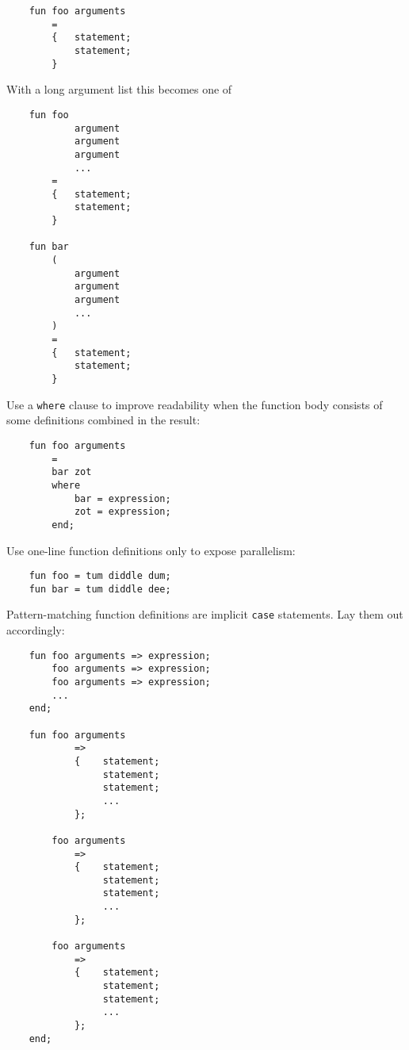 \begin{verbatim}
    fun foo arguments
        =
        {   statement;
            statement;
        }
\end{verbatim}

With a long argument list this becomes one of

\begin{verbatim}
    fun foo
            argument
            argument
            argument
            ...
        =
        {   statement;
            statement;
        }

    fun bar
        (
            argument
            argument
            argument
            ...
        )
        =
        {   statement;
            statement;
        }
\end{verbatim}

Use a {\tt where} clause to improve readability 
when the function body consists of some definitions 
combined in the result:

\begin{verbatim}
    fun foo arguments
        =
        bar zot
        where
            bar = expression;
            zot = expression;
        end;
\end{verbatim}

Use one-line function definitions only to expose parallelism:

\begin{verbatim}
    fun foo = tum diddle dum;
    fun bar = tum diddle dee;
\end{verbatim}

Pattern-matching function definitions are implicit {\tt case} 
statements. Lay them out accordingly:

\begin{verbatim}
    fun foo arguments => expression;
        foo arguments => expression;
        foo arguments => expression;
        ...
    end;

    fun foo arguments
            =>
            {    statement;
                 statement;
                 statement;
                 ...
            };

        foo arguments
            =>
            {    statement;
                 statement;
                 statement;
                 ...
            };

        foo arguments
            =>
            {    statement;
                 statement;
                 statement;
                 ...
            };
    end;

\end{verbatim}


